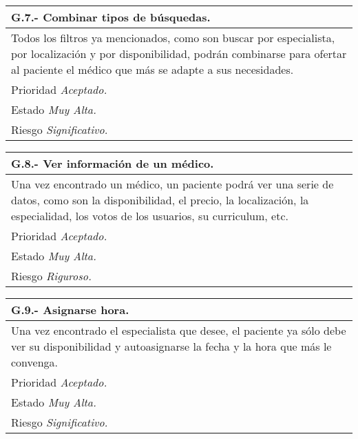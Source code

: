 	\begin{center}
	\begin{tabulary}{15cm}{|L|}
		\hline
			\bf{G.7.- Combinar tipos de búsquedas.} \\
		\hline
			Todos los filtros ya mencionados, como son buscar por especialista, por localización y por disponibilidad, podrán combinarse para ofertar al paciente el médico que más se adapte a sus necesidades. \\
		\hline
			Prioridad \textit{Aceptado.} \\
		\hline
			Estado \textit{Muy Alta.} \\
		\hline
			Riesgo \textit{Significativo.} \\
		\hline
	\end{tabulary}
	\end{center}

	\begin{center}
	\begin{tabulary}{15cm}{|L|}
		\hline
			\bf{G.8.- Ver información de un médico.} \\
		\hline
			Una vez encontrado un médico, un paciente podrá ver una serie de datos, como son la disponibilidad, el precio, la localización, la especialidad, los votos de los usuarios, su curriculum, etc. \\
		\hline
			Prioridad \textit{Aceptado.} \\
		\hline
			Estado \textit{Muy Alta.} \\
		\hline
			Riesgo \textit{Riguroso.} \\
		\hline
	\end{tabulary}
	\end{center}

	\begin{center}
	\begin{tabulary}{15cm}{|L|}
		\hline
			\bf{G.9.- Asignarse hora.} \\
		\hline
			Una vez encontrado el especialista que desee, el paciente ya sólo debe ver su disponibilidad y autoasignarse la fecha y la hora que más le convenga. \\
		\hline
			Prioridad \textit{Aceptado.} \\
		\hline
			Estado \textit{Muy Alta.} \\
		\hline
			Riesgo \textit{Significativo.} \\
		\hline
	\end{tabulary}
	\end{center}

